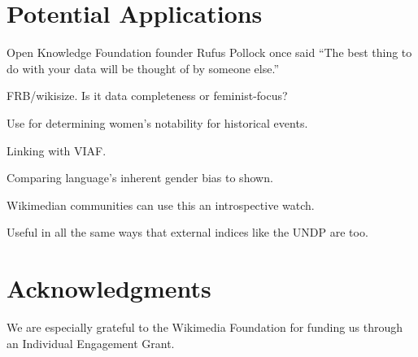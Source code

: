 \documentclass[letterpaper]{article}
\begin{document}
\section{Potential Applications}
Open Knowledge Foundation founder Rufus Pollock once said ``The best thing to do with your data will be thought of by someone else.”

FRB/wikisize. Is it data completeness or feminist-focus?


Use for determining women's notability for historical events.

Linking with VIAF. 

Comparing language's inherent gender bias to shown.

Wikimedian communities can use this an introspective watch.

Useful in all the same ways that external indices like the UNDP are too.


\section{ Acknowledgments}
We are especially grateful to the Wikimedia Foundation for funding us through an Individual Engagement Grant.



\end{document}
